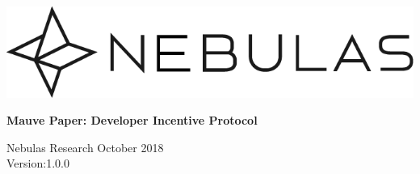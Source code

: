 \documentclass[12pt]{article}
\begin{document}
\pagestyle{empty}

\pagecolor{\pcolor}

\begin{titlepage}
  \begin{center}
    \vspace*{5.5cm}
    \includegraphics[scale=0.5]{../common/Nebulas.png}
    \vspace{0.5cm}


    \textbf{\huge{Mauve Paper: Developer Incentive Protocol}}

    \vspace{0.5cm}
    Nebulas Research
    \vfill
    October 2018\\
    Version:1.0.0
    \textbf{}
  \end{center}

\end{titlepage}
\setcounter{page}{0}
\tableofcontents
\newpage
\setcounter{page}{1}
\pagestyle{fancy}
\vspace*{0.01cm}









\newpage
\begin{appendices}
%
%
\end{appendices}
\end{document}

